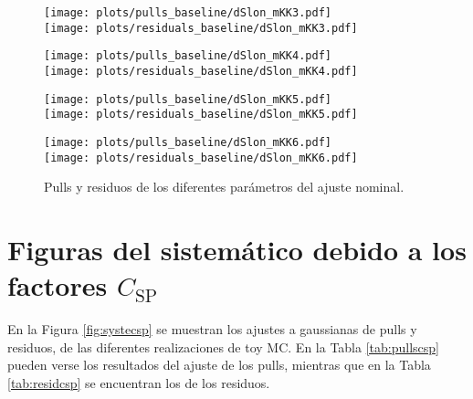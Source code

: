 \begin{subappendices}
\begin{figure}[H] 
  \centering
  \begin{multicols}{2}
  \texttt{[image: plots/pulls\_baseline/dSlon\_mKK3.pdf]}  \\
  \texttt{[image: plots/residuals\_baseline/dSlon\_mKK3.pdf]}
  \end{multicols}  
  \begin{multicols}{2}
  \texttt{[image: plots/pulls\_baseline/dSlon\_mKK4.pdf]}  \\
  \texttt{[image: plots/residuals\_baseline/dSlon\_mKK4.pdf]}
  \end{multicols}  
  \begin{multicols}{2}
  \texttt{[image: plots/pulls\_baseline/dSlon\_mKK5.pdf]}  \\
  \texttt{[image: plots/residuals\_baseline/dSlon\_mKK5.pdf]}
  \end{multicols}  
  \begin{multicols}{2}
  \texttt{[image: plots/pulls\_baseline/dSlon\_mKK6.pdf]}  \\
  \texttt{[image: plots/residuals\_baseline/dSlon\_mKK6.pdf]}
  \end{multicols}    
\caption{Pulls y residuos de los diferentes parámetros del ajuste nominal.}
\end{figure}





\section{Figuras del sistemático debido a los factores \texorpdfstring{$C_{\text{SP}}$}{CSP}}

En la Figura \ref{fig:systecsp} se muestran los ajustes a gaussianas de pulls y residuos, de las diferentes realizaciones de toy MC. En la Tabla \ref{tab:pullscsp} pueden verse los resultados del ajuste de los pulls, mientras que en la Tabla \ref{tab:residcsp} se encuentran los de los residuos.



\end{subappendices}
